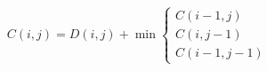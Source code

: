 \begin{equation}
    C(i, j) = D(i, j) + \min \begin{cases}
        C(i-1, j) \\
        C(i, j-1) \\
        C(i-1, j-1)
    \end{cases}
    \label{eq:dtw}
\end{equation}
